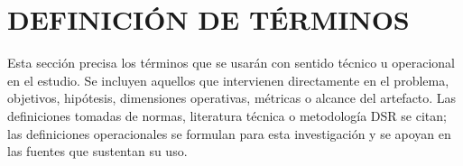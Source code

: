 \section{DEFINICIÓN DE TÉRMINOS}
\label{sec:definicion-terminos}

Esta sección precisa los términos que se usarán con sentido técnico u operacional en el estudio. Se incluyen aquellos que intervienen directamente en el problema, objetivos, hipótesis, dimensiones operativas, métricas o alcance del artefacto. Las definiciones tomadas de normas, literatura técnica o metodología DSR se citan; las definiciones operacionales se formulan para esta investigación y se apoyan en las fuentes que sustentan su uso.

\begingroup
{}
\renewcommand*\descriptionlabel[1]{\refstepcounter{terminodefinicion}\normalfont\bfseries\thesection.\theterminodefinicion. #1}
